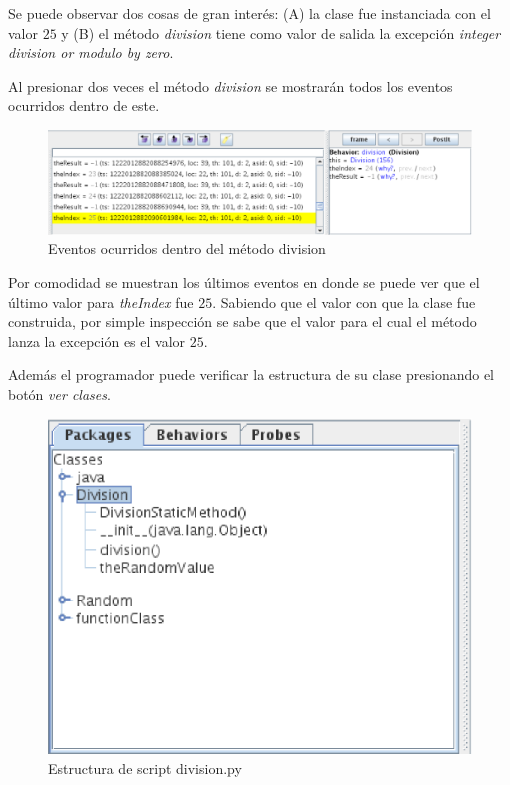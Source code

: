 \documentclass[12pt,legalpaper]{report}
\begin{document}
Se puede observar dos cosas de gran interés: (A) la clase fue instanciada con el valor $25$ y (B) el método \textit{division} tiene como valor de salida la excepción \textit{integer division or modulo by zero}.

Al presionar dos veces el método \textit{division} se mostrarán todos los eventos ocurridos dentro de este.

\begin{figure}[h]
	\centering
	\includegraphics[scale=0.45]{images/division/events.eps}
	\caption{Eventos ocurridos dentro del método division}
\end{figure}

Por comodidad se muestran los últimos eventos en donde se puede ver que el último valor para \textit{theIndex} fue $25$.  Sabiendo que el valor con que la clase fue construida, por simple inspección se sabe que el valor para el cual el método lanza la excepción es el valor $25$.

Además el programador puede verificar la estructura de su clase presionando el botón \textit{ver clases}.

\begin{figure}[h]
	\centering
	\includegraphics[scale=0.6]{images/division/structure.eps}
	\caption{Estructura de script division.py}
\end{figure}
\end{document}

